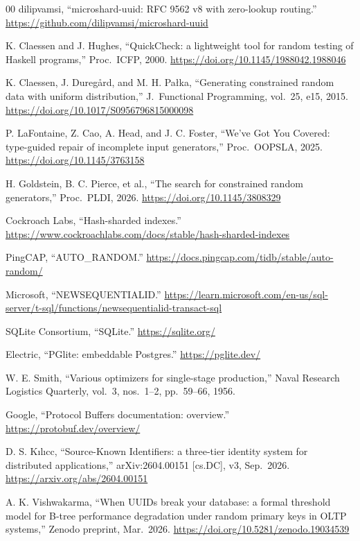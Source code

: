 \documentclass{svproc}
\begin{document}
\begin{thebibliography}{00}
dilipvamsi, ``microshard-uuid: RFC 9562 v8 with zero-lookup routing.'' \url{https://github.com/dilipvamsi/microshard-uuid}

K. Claessen and J. Hughes, ``QuickCheck: a lightweight tool for random testing of Haskell programs,'' Proc.\ ICFP, 2000. \url{https://doi.org/10.1145/1988042.1988046}

K. Claessen, J. Dureg{\aa}rd, and M. H. Pa{\l}ka, ``Generating constrained random data with uniform distribution,'' J.\ Functional Programming, vol.\ 25, e15, 2015. \url{https://doi.org/10.1017/S0956796815000098}

P. LaFontaine, Z. Cao, A. Head, and J. C. Foster, ``We've Got You Covered: type-guided repair of incomplete input generators,'' Proc.\ OOPSLA, 2025. \url{https://doi.org/10.1145/3763158}

H. Goldstein, B. C. Pierce, et al., ``The search for constrained random generators,'' Proc.\ PLDI, 2026. \url{https://doi.org/10.1145/3808329}

Cockroach Labs, ``Hash-sharded indexes.'' \url{https://www.cockroachlabs.com/docs/stable/hash-sharded-indexes}

PingCAP, ``AUTO\_RANDOM.'' \url{https://docs.pingcap.com/tidb/stable/auto-random/}

Microsoft, ``NEWSEQUENTIALID.'' \url{https://learn.microsoft.com/en-us/sql-server/t-sql/functions/newsequentialid-transact-sql}

SQLite Consortium, ``SQLite.'' \url{https://sqlite.org/}

Electric, ``PGlite: embeddable Postgres.'' \url{https://pglite.dev/}

W. E. Smith, ``Various optimizers for single-stage production,'' Naval Research Logistics Quarterly, vol.\ 3, nos.\ 1--2, pp.\ 59--66, 1956.

Google, ``Protocol Buffers documentation: overview.'' \url{https://protobuf.dev/overview/}

D. S. K{\i}l{\i}c{c}, ``Source-Known Identifiers: a three-tier identity system for distributed applications,'' arXiv:2604.00151 [cs.DC], v3, Sep.~2026. \url{https://arxiv.org/abs/2604.00151}

A. K. Vishwakarma, ``When UUIDs break your database: a formal threshold model for B-tree performance degradation under random primary keys in OLTP systems,'' Zenodo preprint, Mar.~2026. \url{https://doi.org/10.5281/zenodo.19034539}

\end{thebibliography}
\end{document}
